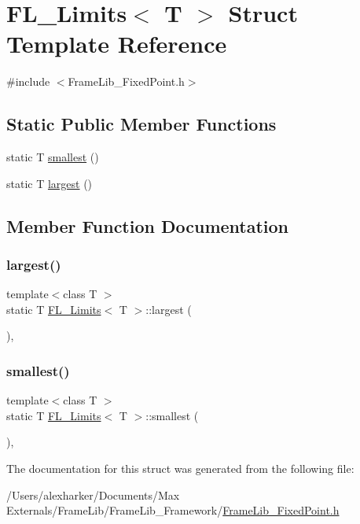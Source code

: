 \hypertarget{struct_f_l___limits}{}\section{F\+L\+\_\+\+Limits$<$ T $>$ Struct Template Reference}
\label{struct_f_l___limits}


{\ttfamily \#include $<$Frame\+Lib\+\_\+\+Fixed\+Point.\+h$>$}

\subsection*{Static Public Member Functions}
\begin{DoxyCompactItemize}
\item 
static T \hyperlink{struct_f_l___limits_a59db5350af5e7253aff0fb348913c2cf}{smallest} ()
\item 
static T \hyperlink{struct_f_l___limits_a38b905652f36709bbad943800945ed4e}{largest} ()
\end{DoxyCompactItemize}


\subsection{Member Function Documentation}
\mbox{\label{struct_f_l___limits_a38b905652f36709bbad943800945ed4e}} 
\subsubsection{\texorpdfstring{largest()}{largest()}}
{\footnotesize\ttfamily template$<$class T $>$ \\
static T \hyperlink{struct_f_l___limits}{F\+L\+\_\+\+Limits}$<$ T $>$\+::largest (\begin{DoxyParamCaption}{ }\end{DoxyParamCaption})\hspace{0.3cm}{\ttfamily [inline]}, {\ttfamily [static]}}

\mbox{\label{struct_f_l___limits_a59db5350af5e7253aff0fb348913c2cf}} 
\subsubsection{\texorpdfstring{smallest()}{smallest()}}
{\footnotesize\ttfamily template$<$class T $>$ \\
static T \hyperlink{struct_f_l___limits}{F\+L\+\_\+\+Limits}$<$ T $>$\+::smallest (\begin{DoxyParamCaption}{ }\end{DoxyParamCaption})\hspace{0.3cm}{\ttfamily [inline]}, {\ttfamily [static]}}



The documentation for this struct was generated from the following file\+:\begin{DoxyCompactItemize}
\item 
/\+Users/alexharker/\+Documents/\+Max Externals/\+Frame\+Lib/\+Frame\+Lib\+\_\+\+Framework/\hyperlink{_frame_lib___fixed_point_8h}{Frame\+Lib\+\_\+\+Fixed\+Point.\+h}\end{DoxyCompactItemize}

